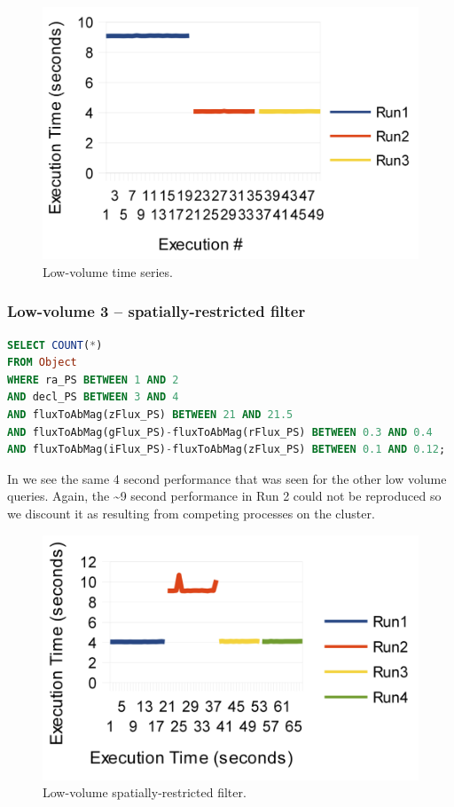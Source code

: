 \documentclass[DM,toc]{lsstdoc}
\begin{document}
\begin{figure}[H]
\centering
\includegraphics{_static/low_volume_time_series}
\caption{Low-volume time series.}
\label{fig:low-volume-time-series}
\end{figure}

\subsubsection{Low-volume 3 -- spatially-restricted
filter}\label{low-volume-3-spatially-restricted-filter}

\begin{lstlisting}[language=SQL]
SELECT COUNT(*)
FROM Object
WHERE ra_PS BETWEEN 1 AND 2
AND decl_PS BETWEEN 3 AND 4
AND fluxToAbMag(zFlux_PS) BETWEEN 21 AND 21.5
AND fluxToAbMag(gFlux_PS)-fluxToAbMag(rFlux_PS) BETWEEN 0.3 AND 0.4
AND fluxToAbMag(iFlux_PS)-fluxToAbMag(zFlux_PS) BETWEEN 0.1 AND 0.12;
\end{lstlisting}

In  we see the same 4 second performance
that was seen for the other low volume queries. Again, the
\textasciitilde{}9 second performance in Run 2 could not be reproduced
so we discount it as resulting from competing processes on the cluster.

\begin{figure}[H]
\centering
\includegraphics{_static/low_volume_spatial_filter}
\caption{Low-volume spatially-restricted filter.}
\label{fig:low-volume-spatial-filter}
\end{figure}
\end{document}
